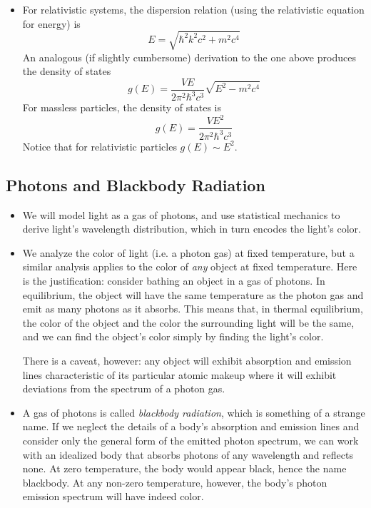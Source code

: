 \documentclass[11pt, a4paper]{article}
\begin{document}
\begin{itemize}
	\item For relativistic systems, the dispersion relation (using the relativistic equation for energy) is
	\begin{equation*}
		E = \sqrt{\hbar^{2}k^{2}c^{2} + m^{2}c^{4}}
	\end{equation*}
	An analogous (if slightly cumbersome) derivation to the one above produces the density of states
	\begin{equation*}
		g(E) = \frac{VE}{2\pi^{2}\hbar^{3}c^{3}} \sqrt{E^{2} - m^{2}c^{4}}
	\end{equation*}
	For massless particles, the density of states is
	\begin{equation*}
		g(E) = \frac{VE^{2}}{2\pi^{2}\hbar^{3}c^{3}}
	\end{equation*}
	Notice that for relativistic particles $ g(E) \sim E^{2} $. 
\end{itemize}

\subsection{Photons and Blackbody Radiation}
\begin{itemize}
	\item We will model light as a gas of photons, and use statistical mechanics to derive light's wavelength distribution, which in turn encodes the light's color.
	
	\item We analyze the color of light (i.e. a photon gas) at fixed temperature, but a similar analysis applies to the color of \textit{any} object at fixed temperature. Here is the justification: consider bathing an object in a gas of photons. In equilibrium, the object will have the same temperature as the photon gas and emit as many photons as it absorbs. This means that, in thermal equilibrium, the color of the object and the color the surrounding light will be the same, and we can find the object's color simply by finding the light's color.
	
	There is a caveat, however: any object will exhibit absorption and emission lines characteristic of its particular atomic makeup where it will exhibit deviations from the spectrum of a photon gas.
	
	\item A gas of photons is called \textit{blackbody radiation}, which is something of a strange name. If we neglect the details of a body's absorption and emission lines and consider only the general form of the emitted photon spectrum, we can work with an idealized body that absorbs photons of any wavelength and reflects none. At zero temperature, the body would appear black, hence the name blackbody. At any non-zero temperature, however, the body's photon emission spectrum will have indeed color.
	
\end{itemize}
\end{document}
